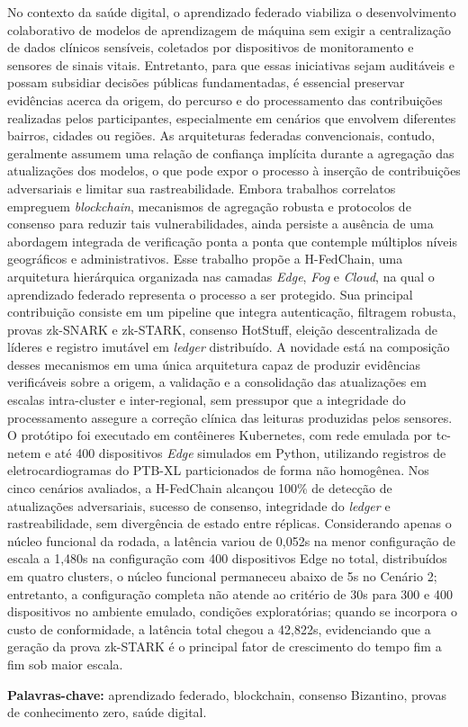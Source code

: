 \documentclass[12pt]{article}
\providecommand{\keywords}[1]{\textbf{Palavras-chave:} #1}
\begin{document}
\begin{resumo} 
No contexto da saúde digital, o aprendizado federado viabiliza o desenvolvimento colaborativo de modelos de aprendizagem de máquina sem exigir a centralização de dados clínicos sensíveis, coletados por dispositivos de monitoramento e sensores de sinais vitais. Entretanto, para que essas iniciativas sejam auditáveis e possam subsidiar decisões públicas fundamentadas, é essencial preservar evidências acerca da origem, do percurso e do processamento das contribuições realizadas pelos participantes, especialmente em cenários que envolvem diferentes bairros, cidades ou regiões. As arquiteturas federadas convencionais, contudo, geralmente assumem uma relação de confiança implícita durante a agregação das atualizações dos modelos, o que pode expor o processo à inserção de contribuições adversariais e limitar sua rastreabilidade. Embora trabalhos correlatos empreguem \textit{blockchain}, mecanismos de agregação robusta e protocolos de consenso para reduzir tais vulnerabilidades, ainda persiste a ausência de uma abordagem integrada de verificação ponta a ponta que contemple múltiplos níveis geográficos e administrativos. Esse trabalho propõe a H-FedChain, uma arquitetura hierárquica organizada nas camadas \textit{Edge}, \textit{Fog} e \textit{Cloud}, na qual o aprendizado federado representa o processo a ser protegido. Sua principal contribuição consiste em um pipeline que integra autenticação, filtragem robusta, provas zk-SNARK e zk-STARK, consenso HotStuff, eleição descentralizada de líderes e registro imutável em \textit{ledger} distribuído. A novidade está na composição desses mecanismos em uma única arquitetura capaz de produzir evidências verificáveis sobre a origem, a validação e a consolidação das atualizações em escalas intra-cluster e inter-regional, sem pressupor que a integridade do processamento assegure a correção clínica das leituras produzidas pelos sensores. O protótipo foi executado em contêineres Kubernetes, com rede emulada por tc-netem e até 400 dispositivos \textit{Edge} simulados em Python, utilizando registros de eletrocardiogramas do PTB-XL particionados de forma não homogênea. Nos cinco cenários avaliados, a H-FedChain alcançou 100\% de detecção de atualizações adversariais, sucesso de consenso, integridade do \textit{ledger} e rastreabilidade, sem divergência de estado entre réplicas. Considerando apenas o núcleo funcional da rodada, a latência variou de 0,052s na menor configuração de escala a 1,480s na configuração com 400 dispositivos Edge no total, distribuídos em quatro clusters, o núcleo funcional permaneceu abaixo de 5s no Cenário 2; entretanto, a configuração completa não atende ao critério de 30s para 300 e 400 dispositivos no ambiente emulado, condições exploratórias; quando se incorpora o custo de conformidade, a latência total chegou a 42,822s, evidenciando que a geração da prova zk-STARK é o principal fator de crescimento do tempo fim a fim sob maior escala.

\keywords{aprendizado federado, blockchain, consenso Bizantino, provas de conhecimento zero, saúde digital.}
\end{resumo}
\end{document}
